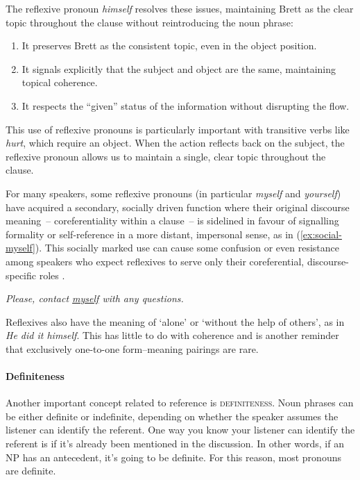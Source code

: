 The reflexive pronoun \textit{himself} resolves these issues, maintaining Brett as the clear topic throughout the clause without reintroducing the noun phrase:

\begin{enumerate}[noitemsep]
    \item It preserves Brett as the consistent topic, even in the object position.
    \item It signals explicitly that the subject and object are the same, maintaining topical coherence.
    \item It respects the ``given'' status of the information without disrupting the flow.
\end{enumerate}

This use of reflexive pronouns is particularly important with transitive verbs like \textit{hurt}, which require an object. When the action reflects back on the subject, the reflexive pronoun allows us to maintain a single, clear topic throughout the clause.

For many speakers, some reflexive pronouns (in particular \textit{myself} and \textit{yourself}) have acquired a secondary, socially driven function where their original discourse meaning~-- coreferentiality within a clause~-- is sidelined in favour of signalling formality or self-reference in a more distant, impersonal sense, as in (\ref{ex:social-myself}). This socially marked use can cause some confusion or even resistance among speakers who expect reflexives to serve only their coreferential, discourse-specific roles \citep{Gilman1989}.

\ea\textit{Please, contact \uline{myself} with any questions.}\label{ex:social-myself}
\z

Reflexives also have the meaning of `alone' or `without the help of others', as in \textit{He did it himself}. This has little to do with coherence and is another reminder that exclusively one-to-one form--meaning pairings are rare.

\paragraph*{Definiteness}
Another important concept related to reference is \textsc{definiteness}. Noun phrases can be either definite or indefinite, depending on whether the speaker assumes the listener can identify the referent. One way you know your listener can identify the referent is if it's already been mentioned in the discussion. In other words, if an NP has an antecedent, it's going to be definite. For this reason, most pronouns are definite.

